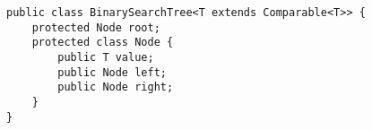 \begin{lstlisting}
public class BinarySearchTree<T extends Comparable<T>> {
    protected Node root;
    protected class Node {
        public T value;
        public Node left;
        public Node right;
    }
}
\end{lstlisting}